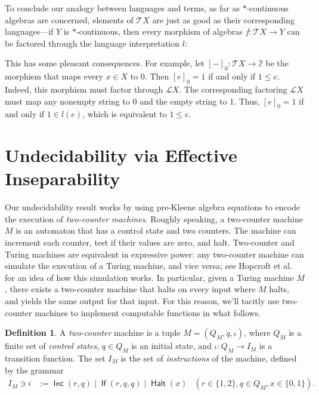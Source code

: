\documentclass[11pt,a4paper]{amsart}
\theoremstyle{definition}
\newtheorem{definition}[theorem]{Definition}
\DeclareMathOperator{\Inc}{\mathsf{Inc}}
\DeclareMathOperator{\If}{\mathsf{If}}
\DeclareMathOperator{\Halt}{\mathsf{Halt}}
\begin{document}
To conclude our analogy between languages and terms, as far as $*$-continuous
algebras are concerned, elements of $\mathcal{T}X$ are just as good as their
%
corresponding languages---if $Y$ is $*$-continuous, then every morphism of
algebras $f : \mathcal{T}X  \to  Y$ can be factored through the language
interpretation $l$:
\begin{center}
\end{center}
This has some pleasant consequences.  For example, let
$[-]_0 : \mathcal{T}X  \to  \mathbb{2}$ be the morphism that maps every $x  \in  X$ to
0. Then $[e]_0 = 1$ if and only if $1  \leq  e$.  Indeed, this morphism must factor
through $\mathcal{L}X$.  The corresponding factoring $\mathcal{L}X$ must map any
nonempty string to 0 and the empty string to 1.  Thus, $[e]_0 = 1$ if and only
if $1  \in  l(e)$, which is equivalent to $1  \leq  e$.



\section{Undecidability via Effective Inseparability}
\label{sec:machines}

Our undecidability result works by using pre-Kleene algebra equations to encode
the execution of \emph{two-counter machines}.  Roughly speaking, a two-counter
machine $M$ is an automaton that has a control state and two counters.  The
machine can increment each counter, test if their values are zero, and halt.
%
Two-counter and Turing machines are equivalent in expressive power: any
two-counter machine can simulate the execution of a Turing machine, and vice
versa; see Hopcroft et al.~\cite[§8.5.3,§8.5.4]{Hopcroft2001} for an idea of how
this simulation works.  In particular, given a Turing machine $M$, there exists
a two-counter machine that halts on every input where $M$ halts, and yields the
same output for that input.  For this reason, we'll tacitly use two-counter
machines to implement computable functions in what follows.


\begin{definition}
  \label{def:two-counter-machine}
  A \emph{two-counter} machine is a tuple $M = (Q_M, \dot{q},  \iota )$, where $Q_M$
  is a finite set of \emph{control states}, $\dot{q}  \in  Q_M$ is an initial state,
  and $ \iota  : Q_M  \to  I_M$ is a transition function.  The set $I_M$ is the set of
  \emph{instructions} of the machine, defined by the grammar
  \begin{align*}
    I_M \ni i
    & := \Inc(r, q) \mid \If(r,q,q) \mid \Halt(x)
    & (r \in \{1,2\}, q \in Q_M, x \in \{0,1\}).
  \end{align*}
\end{definition}
\end{document}
